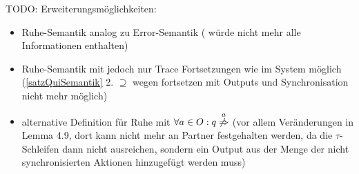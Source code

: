 \scriptsize\textcolor{lgray}{TODO: Erweiterungsmöglichkeiten:
\begin{itemize}
  \item Ruhe-Semantik analog zu Error-Semantik (\EL{} würde nicht mehr alle
    Informationen enthalten)
  \item Ruhe-Semantik mit \prune{} jedoch nur Trace Fortsetzungen wie im System
    möglich (\ref{satzQuiSemantik} 2. $\supseteq$ wegen fortsetzen mit Outputs
    und Synchronisation nicht mehr möglich)
  \item alternative Definition für Ruhe mit $\forall a\in O: q
    \overset{a}{\not{\hspace{-0.1cm}\Rightarrow}}$ (vor allem Veränderungen in
    Lemma 4.9, dort kann nicht mehr an Partner festgehalten werden, da die
    $\tau$-Schleifen dann nicht ausreichen, sondern ein Output aus der Menge
    der nicht synchronisierten Aktionen hinzugefügt werden muss)
\end{itemize}}

\normalsize
